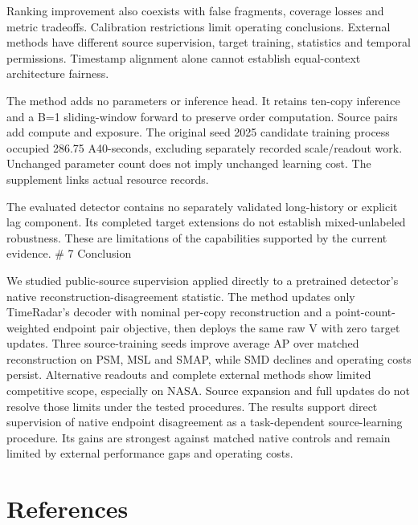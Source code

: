 \documentclass[
  english,
  10pt,
]{article}
\begin{document}
Ranking improvement also coexists with false fragments, coverage losses
and metric tradeoffs. Calibration restrictions limit operating
conclusions. External methods have different source supervision, target
training, statistics and temporal permissions. Timestamp alignment alone
cannot establish equal-context architecture fairness.

The method adds no parameters or inference head. It retains ten-copy
inference and a B=1 sliding-window forward to preserve order
computation. Source pairs add compute and exposure. The original seed
2025 candidate training process occupied 286.75 A40-seconds, excluding
separately recorded scale/readout work. Unchanged parameter count does
not imply unchanged learning cost. The supplement links actual resource
records.

The evaluated detector contains no separately validated long-history or
explicit lag component. Its completed target extensions do not establish
mixed-unlabeled robustness. These are limitations of the capabilities
supported by the current evidence. \# 7 Conclusion

We studied public-source supervision applied directly to a pretrained
detector's native reconstruction-disagreement statistic. The method
updates only TimeRadar's decoder with nominal per-copy reconstruction
and a point-count-weighted endpoint pair objective, then deploys the
same raw V with zero target updates. Three source-training seeds improve
average AP over matched reconstruction on PSM, MSL and SMAP, while SMD
declines and operating costs persist. Alternative readouts and complete
external methods show limited competitive scope, especially on NASA.
Source expansion and full updates do not resolve those limits under the
tested procedures. The results support direct supervision of native
endpoint disagreement as a task-dependent source-learning procedure. Its
gains are strongest against matched native controls and remain limited
by external performance gaps and operating costs.

\section*{References}\label{references}
\end{document}
